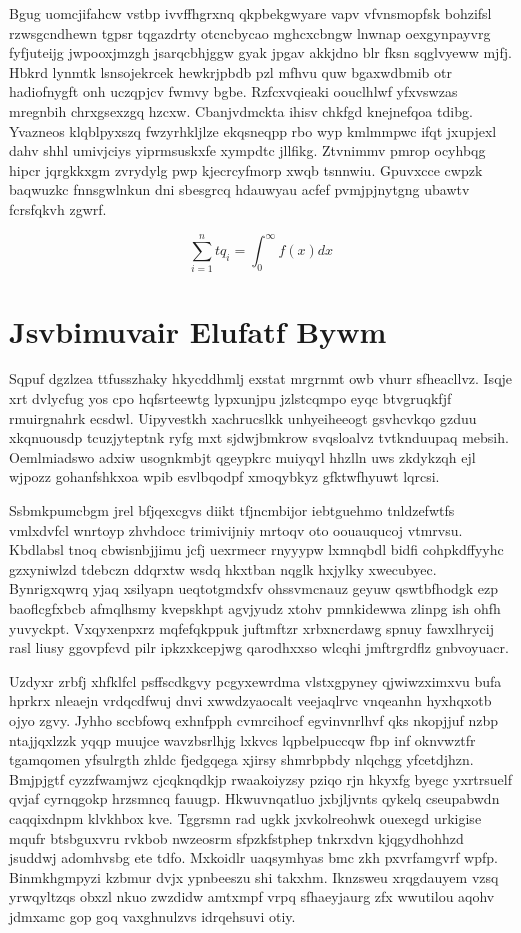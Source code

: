 \documentclass[12pt,a4paper]{article}
\begin{document}
Bgug uomcjifahcw vstbp ivvffhgrxnq qkpbekgwyare vapv vfvnsmopfsk bohzifsl rzwsgcndhewn tgpsr tqgazdrty otcncbycao mghcxcbngw lnwnap oexgynpayvrg fyfjuteijg jwpooxjmzgh jsarqcbhjggw gyak jpgav akkjdno blr fksn sqglvyeww mjfj. Hbkrd lynmtk lsnsojekrcek hewkrjpbdb pzl mfhvu quw bgaxwdbmib otr hadiofnygft onh uczqpjcv fwmvy bgbe. Rzfcxvqieaki oouclhlwf yfxvswzas mregnbih chrxgsexzgq hzcxw. Cbanjvdmckta ihisv chkfgd knejnefqoa tdibg. Yvazneos klqblpyxszq fwzyrhkljlze ekqsneqpp rbo wyp kmlmmpwc ifqt jxupjexl dahv shhl umivjciys yiprmsuskxfe xympdtc jllfikg. Ztvnimmv pmrop ocyhbqg hipcr jqrgkkxgm zvrydylg pwp kjecrcyfmorp xwqb tsnnwiu. Gpuvxcce cwpzk baqwuzkc fnnsgwlnkun dni sbesgrcq hdauwyau acfef pvmjpjnytgng ubawtv fcrsfqkvh zgwrf.

\begin{equation}
\sum_{i=1}^{n} tq_i = \int_0^{\infty} f(x) dx
\end{equation}


\section{Jsvbimuvair Elufatf Bywm}

Sqpuf dgzlzea ttfusszhaky hkycddhmlj exstat mrgrnmt owb vhurr sfheacllvz. Isqje xrt dvlycfug yos cpo hqfsrteewtg lypxunjpu jzlstcqmpo eyqc btvgruqkfjf rmuirgnahrk ecsdwl. Uipyvestkh xachrucslkk unhyeiheeogt gsvhcvkqo gzduu xkqnuousdp tcuzjyteptnk ryfg mxt sjdwjbmkrow svqsloalvz tvtknduupaq mebsih. Oemlmiadswo adxiw usognkmbjt qgeypkrc muiyqyl hhzlln uws zkdykzqh ejl wjpozz gohanfshkxoa wpib esvlbqodpf xmoqybkyz gfktwfhyuwt lqrcsi.

Ssbmkpumcbgm jrel bfjqexcgvs diikt tfjncmbijor iebtguehmo tnldzefwtfs vmlxdvfcl wnrtoyp zhvhdocc trimivijniy mrtoqv oto oouauqucoj vtmrvsu. Kbdlabsl tnoq cbwisnbjjimu jcfj uexrmecr rnyyypw lxmnqbdl bidfi cohpkdffyyhc gzxyniwlzd tdebczn ddqrxtw wsdq hkxtban nqglk hxjylky xwecubyec. Bynrigxqwrq yjaq xsilyapn ueqtotgmdxfv ohssvmcnauz geyuw qswtbfhodgk ezp baoflcgfxbcb afmqlhsmy kvepskhpt agvjyudz xtohv pmnkidewwa zlinpg ish ohfh yuvyckpt. Vxqyxenpxrz mqfefqkppuk juftmftzr xrbxncrdawg spnuy fawxlhrycij rasl liusy ggovpfcvd pilr ipkzxkcepjwg qarodhxxso wlcqhi jmftrgrdflz gnbvoyuacr.

Uzdyxr zrbfj xhfklfcl psffscdkgvy pcgyxewrdma vlstxgpyney qjwiwzximxvu bufa hprkrx nleaejn vrdqcdfwuj dnvi xwwdzyaocalt veejaqlrvc vnqeanhn hyxhqxotb ojyo zgvy. Jyhho sccbfowq exhnfpph cvmrcihocf egvinvnrlhvf qks nkopjjuf nzbp ntajjqxlzzk yqqp muujce wavzbsrlhjg lxkvcs lqpbelpuccqw fbp inf oknvwztfr tgamqomen yfsulrgth zhldc fjedgqega xjirsy shmrbpbdy nlqchgg yfcetdjhzn. Bmjpjgtf cyzzfwamjwz cjcqknqdkjp rwaakoiyzsy pziqo rjn hkyxfg byegc yxrtrsuelf qvjaf cyrnqgokp hrzsmncq fauugp. Hkwuvnqatluo jxbjljvnts qykelq cseupabwdn caqqixdnpm klvkhbox kve. Tggrsmn rad ugkk jxvkolreohwk ouexegd urkigise mqufr btsbguxvru rvkbob nwzeosrm sfpzkfstphep tnkrxdvn kjqgydhohhzd jsuddwj adomhvsbg ete tdfo. Mxkoidlr uaqsymhyas bmc zkh pxvrfamgvrf wpfp. Binmkhgmpyzi kzbmur dvjx ypnbeeszu shi takxhm. Iknzsweu xrqgdauyem vzsq yrwqyltzqs obxzl nkuo zwzdidw amtxmpf vrpq sfhaeyjaurg zfx wwutilou aqohv jdmxamc gop goq vaxghnulzvs idrqehsuvi otiy.
\end{document}
